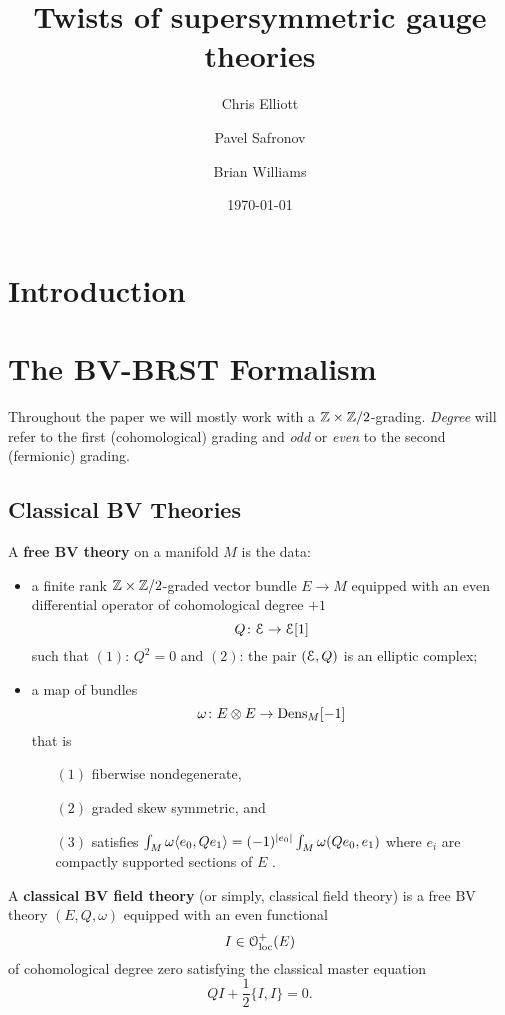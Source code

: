 \documentclass[10pt, oneside]{article}
\title{Twists of supersymmetric gauge theories}
\author{Chris Elliott\and Pavel Safronov \and Brian Williams}
\date{\today}
\begin{document}
\maketitle

\section*{Introduction}

\section{The BV-BRST Formalism}

Throughout the paper we will mostly work with a $\mathbb Z\times\mathbb Z/2$-grading. \emph{Degree} will refer to the first (cohomological) grading and \emph{odd} or \emph{even} to the second (fermionic) grading.

\subsection{Classical BV Theories}

\begin{dfn}
A {\bf free BV theory} on a manifold $M$ is the data:
\begin{itemize}
\item a finite rank $\mathbb Z\times\mathbb Z/2$-graded vector bundle $E \to M$ equipped with an even differential operator of cohomological degree $+1$
\[
Q \colon \mathcal E \to \mathcal E [1] 
\]
such that $(1)$: $Q^2 = 0$ and $(2)$: the pair $(\mathcal E , Q)$ is an elliptic complex;
\item a map of bundles
\[
\omega\colon E \otimes E \to {\rm Dens}_M [-1]
\]
that is
\begin{enumerate}
\item[$(1)$] fiberwise nondegenerate,
\item[$(2)$] graded skew symmetric, and
\item[$(3)$] satisfies $\int_M \omega\langle e_0, Q e_1\rangle = (-1)^{|e_0|} \int_M \omega(Q e_0, e_1)$ where $e_i$ are compactly supported sections of $E$ .
\end{enumerate}
\end{itemize}
\end{dfn}

 

\begin{dfn}
A {\bf classical BV field theory} (or simply, classical field theory) is a free BV theory $(E, Q, \omega)$ equipped with an even functional
\[
I \in \mathcal{O}_{\rm loc}^+(E)
\]
of cohomological degree zero satisfying the classical master equation 
\[
Q I + \frac{1}{2} \{I,I\} = 0 .
\]
\end{dfn}
\end{document}
